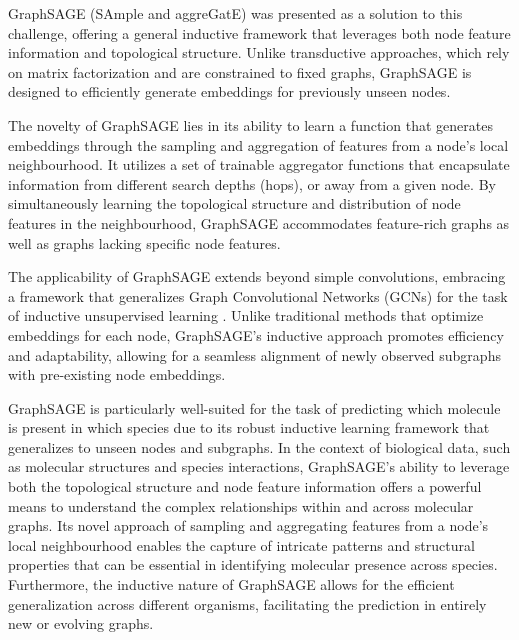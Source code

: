 \documentclass[
11pt, %
oneside, %
english, %
singlespacing, %
headsepline, %
chapterinoneline, %
]{MastersDoctoralThesis} %
\begin{document}
GraphSAGE (SAmple and aggreGatE) \cite{hamiltonInductiveRepresentationLearning2017} was presented as a solution to this challenge, offering a general inductive framework that leverages both node feature information and topological structure. Unlike transductive approaches, which rely on matrix factorization and are constrained to fixed graphs, GraphSAGE is designed to efficiently generate embeddings for previously unseen nodes.

The novelty of GraphSAGE lies in its ability to learn a function that generates embeddings through the sampling and aggregation of features from a node's local neighbourhood. It utilizes a set of trainable aggregator functions that encapsulate information from different search depths (hops), or away from a given node. By simultaneously learning the topological structure and distribution of node features in the neighbourhood, GraphSAGE accommodates feature-rich graphs as well as graphs lacking specific node features.

The applicability of GraphSAGE extends beyond simple convolutions, embracing a framework that generalizes Graph Convolutional Networks (GCNs) for the task of inductive unsupervised learning \cite{kipfSemiSupervisedClassificationGraph2016}. Unlike traditional methods that optimize embeddings for each node, GraphSAGE's inductive approach promotes efficiency and adaptability, allowing for a seamless alignment of newly observed subgraphs with pre-existing node embeddings.

GraphSAGE is particularly well-suited for the task of predicting which molecule is present in which species due to its robust inductive learning framework that generalizes to unseen nodes and subgraphs. In the context of biological data, such as molecular structures and species interactions, GraphSAGE's ability to leverage both the topological structure and node feature information offers a powerful means to understand the complex relationships within and across molecular graphs. Its novel approach of sampling and aggregating features from a node's local neighbourhood enables the capture of intricate patterns and structural properties that can be essential in identifying molecular presence across species. Furthermore, the inductive nature of GraphSAGE allows for the efficient generalization across different organisms, facilitating the prediction in entirely new or evolving graphs.
\end{document}
